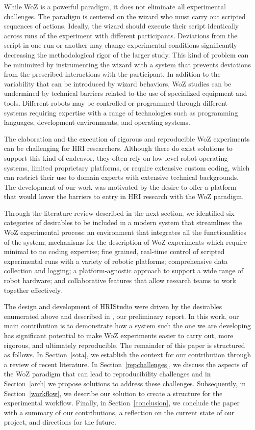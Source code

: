 \documentclass[letterpaper, 10 pt, conference]{subfiles/ieeeconf}
\begin{document}
While WoZ is a powerful paradigm, it does not eliminate all experimental challenges. The paradigm is centered on the wizard who must carry out scripted sequences of actions. Ideally, the wizard should execute their script identically across runs of the experiment with different participants. Deviations from the script in one run or another may change experimental conditions significantly decreasing the methodological rigor of the larger study. This kind of problem can be minimized by instrumenting the wizard with a system that prevents deviations from the prescribed interactions with the participant. In addition to the variability that can be introduced by wizard behaviors, WoZ studies can be undermined by technical barriers related to the use of specialized equipment and tools. Different robots may be controlled or programmed through different systems requiring expertise with a range of technologies such as programming languages, development environments, and operating systems. 

The elaboration and the execution of rigorous and reproducible WoZ experiments can be challenging for HRI researchers. Although there do exist solutions to support this kind of endeavor, they often rely on low-level robot operating systems, limited proprietary platforms, or require extensive custom coding, which can restrict their use to domain experts with extensive technical backgrounds. The development of our work was motivated by the desire to offer a platform that would lower the barriers to entry in HRI research with the WoZ paradigm. 

Through the literature review described in the next section, we identified six categories of desirables to be included in a modern system that streamlines the WoZ experimental process: an environment that integrates all the functionalities of the system; mechanisms for the description of WoZ experiments which require minimal to no coding expertise; fine grained, real-time control of scripted experimental runs with a variety of robotic platforms; comprehensive data collection and logging; a platform-agnostic approach to support a wide range of robot hardware; and collaborative features that allow research teams to work together effectively.

The design and development of HRIStudio were driven by the desirables enumerated above and described in \cite{OConnor2024}, our preliminary report. In this work, our main contribution is to demonstrate how a system such the one we are developing has significant potential to make WoZ experiments easier to carry out, more rigorous, and ultimately reproducible. The remainder of this paper is structured as follows. In Section~\ref{sota}, we establish the context for our contribution through a review of recent literature. In Section~\ref{repchallenges}, we discuss the aspects of the WoZ paradigm that can lead to reproducibility challenges and in Section~\ref{arch} we propose solutions to address these challenges. Subsequently, in Section~\ref{workflow}, we describe our solution to create a structure for the experimental workflow. Finally, in Section~\ref{conclusion}, we conclude the paper with a summary of our contributions, a reflection on the current state of our project, and directions for the future.
\end{document}
